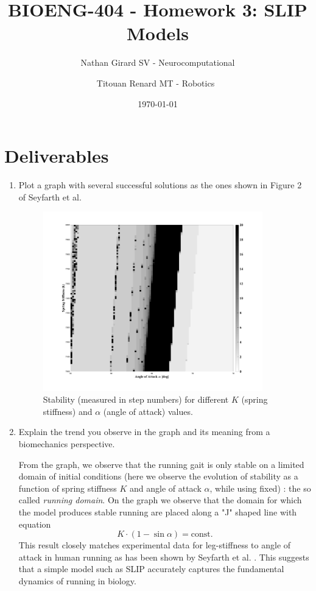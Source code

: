 \documentclass[11pt]{article}
\title{BIOENG-404 - Homework 3: SLIP Models}
\author{
    Nathan Girard
        SV - Neurocomputational
        \and
    Titouan Renard
            MT - Robotics 
}
\date{\today}
\begin{document}
\maketitle

\section{Deliverables}

\begin{enumerate}
    \item Plot a graph with several successful solutions as the ones shown in Figure 2 of Seyfarth et al.
    \begin{adjustwidth}{0.5cm}{}
        \begin{figure}[h!]
            \centering
            \includegraphics[width=0.9\textwidth]{screens/plot_2.jpg}
            \caption{Stability (measured in step numbers) for different $K$ (spring stiffness) and $\alpha$ (angle of attack) values.}
            \label{stability_domain}
        \end{figure}
    \end{adjustwidth}

    \item Explain the trend you observe in the graph and its meaning from a biomechanics perspective.
    \begin{adjustwidth}{0.5cm}{}
        From the graph, we observe that the running gait is only stable on a limited domain of initial conditions (here we observe the evolution of stability as a function of spring stiffness $K$ and angle of attack $\alpha$, while using fixed) : the so called \textit{running domain}. On the graph we observe that the domain for which the model produces stable running are placed along a "J" shaped line with equation 
        \[ K \cdot (1 - \sin \alpha) = \text{const}. \]
        This result closely matches experimental data for leg-stiffness to angle of attack in human running as has been shown by Seyfarth et al. \cite{1}. This suggests that a simple model such as SLIP accurately captures the fundamental dynamics of running in biology.
    \end{adjustwidth}


\end{enumerate}
\end{document}
